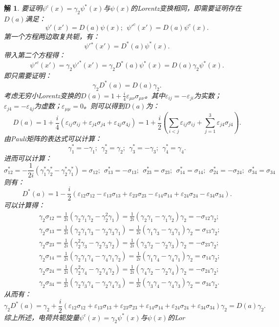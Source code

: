 \documentclass[UTF8,10pt,a4paper]{article}
\theoremstyle{Problem}%
\theoremstyle{Solution}%
\newtheorem*{sol}{解}%
\begin{document}
\begin{sol}
要证明$\psi^c(x) = \gamma_2\psi^*(x)$与$\psi(x)$的Lorentz变换相同，即需要证明存在$D(a)$满足：
\[
    \psi'(x') = D(a)\psi(x); ~~ \psi'^c(x') = D(a)\psi^c(x).
\]
第一个方程两边取复共轭，有：
\[
    \psi'{}^* (x') = D^*(a)\psi^*(x).
\]
带入第二个方程得：
\[
    \psi'^c(x') = \gamma_2\psi'^*(x') = \gamma_2 D^*(a)\psi^*(x) = D(a)\gamma_2\psi^*(x).
\]
即只需要证明：
\[
    \gamma_2D^*(a) = D(a)\gamma_2.
\]
考虑无穷小Lorentz变换的$D(a) = 1+\frac{i}{4}\varepsilon_{\mu\nu}\sigma_{\mu\nu}$。其中$\varepsilon_{ij} = -\varepsilon_{ji}$为实数；$\varepsilon_{j4} = -\varepsilon_{4j}$为虚数；$\varepsilon_{\mu\mu} = 0$。则可以得到$D(a)$为：
\[
    D(a) = 1 + \frac{i}{4}(\varepsilon_{ij}\sigma_{ij} + \varepsilon_{j4}\sigma_{j4} + \varepsilon_{4j}\sigma_{4j}) = 1 + \frac{i}{2}\left( \sum_{i<j} \varepsilon_{ij}\sigma_{ij} + \sum_{j=1}^3 \varepsilon_{j4}\sigma_{j4} \right).
\]
由Pauli矩阵的表达式可以计算：
\[
    \gamma_1^* = -\gamma_1; ~~ \gamma_2^* = \gamma_2; ~~ \gamma_3^* = -\gamma_3; ~~ \gamma_4^* = \gamma_4.
\]
进而可以计算：
\[
    \sigma_{12}^* = -\frac{1}{2i}(\gamma_1^* \gamma_2^* - \gamma_2^*\gamma_1^*) = \sigma_{12}; ~~ \sigma_{13}^* = -\sigma_{13}; ~~ \sigma_{23}^* = \sigma_{23}; ~~ \sigma_{14}^* = \sigma_{14}; ~~ \sigma_{24}^* = -\sigma_{24}; ~~ \sigma_{34}^* = \sigma_{34}
\]
则有：
\[
    D^*(a) = 1 - \frac{i}{2}\left( \varepsilon_{12}\sigma_{12} - \varepsilon_{13}\sigma_{13} + \varepsilon_{23}\sigma_{23} - \varepsilon_{14}\sigma_{14} + \varepsilon_{24}\sigma_{24} - \varepsilon_{34}\sigma_{34} \right).
\]
可以计算得：
\[
    \begin{aligned}
    &\gamma_2 \sigma_{12} = \frac{1}{2i}(\gamma_2\gamma_1\gamma_2 - \gamma_2^2\gamma_1) = \frac{1}{2i}(\gamma_2\gamma_1 - \gamma_1\gamma_2)\gamma_2 = -\sigma_{12}\gamma_2; \\
    &\gamma_2 \sigma_{13} = \frac{1}{2i}(\gamma_2\gamma_1\gamma_3 - \gamma_2\gamma_3\gamma_1) = \frac{1}{2i}(\gamma_1\gamma_3-\gamma_3\gamma_1)\gamma_2 = \sigma_{13}\gamma_2; \\
    &\gamma_2\sigma_{23} = \frac{1}{2i}(\gamma_2^2\gamma_3-\gamma_2\gamma_3\gamma_2) = \frac{1}{2i}(\gamma_3\gamma_2 - \gamma_2\gamma_3)\gamma_2 = -\sigma_{23}\gamma_2; \\
    &\gamma_2\sigma_{14} = \frac{1}{2i}(\gamma_2\gamma_1\gamma_4 - \gamma_4\gamma_1\gamma_2) = \frac{1}{2i}(\gamma_1\gamma_4-\gamma_4\gamma_1)\gamma_2 = \sigma_{14}\gamma_2; \\
    &\gamma_2 \sigma_{24} = \frac{1}{2i}(\gamma_2^2\gamma_4 - \gamma_2\gamma_4\gamma_2) = \frac{1}{2i}(\gamma_4\gamma_2-\gamma_2\gamma_4)\gamma_2 = -\sigma_{24}\gamma_2; \\
    &\gamma_2\sigma_{34} = \frac{1}{2i}(\gamma_2\gamma_3\gamma_4 - \gamma_2\gamma_4\gamma_3) = \frac{1}{2i}(\gamma_3\gamma_4-\gamma_4\gamma_3)\gamma_2 = \sigma_{34}\gamma_2.
    \end{aligned}
\]
从而有：
\[
    \gamma_2 D^*(a) = \gamma_2 + \frac{i}{2}(\varepsilon_{12}\sigma_{12} + \varepsilon_{13}\sigma_{13} + \varepsilon_{23}\sigma_{23} + \varepsilon_{14}\sigma_{14} + \varepsilon_{24}\sigma_{24} + \varepsilon_{34}\sigma_{34})\gamma_2 = D(a)\gamma_2.
\]
综上所述，电荷共轭旋量$\psi^c(x) = \gamma_2\psi^*(x)$与$\psi(x)$的Lor
\end{sol}
\end{document}
